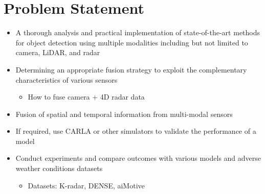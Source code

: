 \documentclass[rnd]{mas_proposal}
\begin{document}
\begin{itemize}
\end{itemize}

\section{Problem Statement}
\begin{itemize}
    
    

    
    \item A thorough analysis and practical implementation of state-of-the-art methods for object detection using multiple modalities including but not limited to camera, LiDAR, and radar
        
    \item Determining an appropriate fusion strategy to exploit the complementary characteristics of various sensors
    \begin{itemize}
        \item How to fuse camera + 4D radar data
    \end{itemize}
    
    \item Fusion of spatial and temporal information from multi-modal sensors

    \item If required, use CARLA or other simulators to validate the performance of a model 
    
    \item Conduct experiments and compare outcomes with various models and adverse weather conditions datasets
    \begin{itemize}
        \item Datasets: K-radar\cite{Paek2022Jun}, DENSE\cite{bijelic2020seeing}, aiMotive\cite{Matuszka2022Nov}
    \end{itemize}    


    
\end{itemize}
\end{document}
